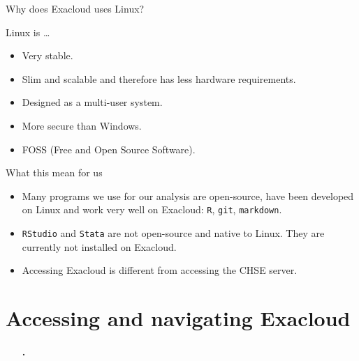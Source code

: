 \documentclass[12pt,t,xcolor=table]{beamer}
\begin{document}
\begin{frame}[label={sec:orgheadline6}]{Why does Exacloud uses Linux?}
\vspace{0.5em}

Linux is \ldots{}

\begin{itemize}
\item Very stable.\setlength\itemsep{0.5em}

\item Slim and scalable and therefore has less hardware requirements.

\item Designed as a multi-user system.

\item More secure than Windows.

\item FOSS (Free and Open Source Software).
\end{itemize}
\end{frame}

\begin{frame}[fragile,label={sec:orgheadline7}]{What this mean for us}
 \vspace{1.0em}

\begin{itemize}
\item Many programs we use for our analysis are open-source, have been developed on Linux and work very well on Exacloud: \texttt{R}, \texttt{git}, \texttt{markdown}.\setlength\itemsep{0.5em}

\item \texttt{RStudio} and \texttt{Stata} are not open-source and native to Linux. They are currently not installed on Exacloud.

\item Accessing Exacloud is different from accessing the CHSE server.
\end{itemize}
\end{frame}

\section{Accessing and navigating Exacloud}
\label{sec:orgheadline12}
\begin{frame}[c]{}
  \begin{itemize}
    \item[\bf\thesection.] \bf\insertsection
  \end{itemize}          
\end{frame}
\end{document}
